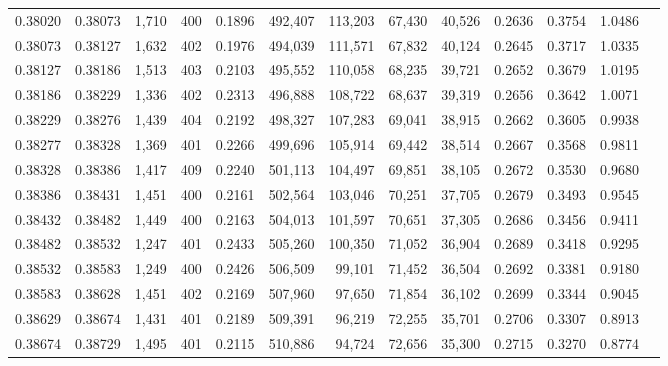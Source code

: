 \begin{tabular}{rrrrrrrrrrrrr}
0.38020 & 0.38073 &  1,710 & 400 &                                     0.1896 & 492,407 & 113,203 &  67,430 &  40,526 & 0.2636 & 0.3754 & 1.0486 \\
0.38073 & 0.38127 &  1,632 & 402 &                                     0.1976 & 494,039 & 111,571 &  67,832 &  40,124 & 0.2645 & 0.3717 & 1.0335 \\
0.38127 & 0.38186 &  1,513 & 403 &                                     0.2103 & 495,552 & 110,058 &  68,235 &  39,721 & 0.2652 & 0.3679 & 1.0195 \\
0.38186 & 0.38229 &  1,336 & 402 &                                     0.2313 & 496,888 & 108,722 &  68,637 &  39,319 & 0.2656 & 0.3642 & 1.0071 \\
0.38229 & 0.38276 &  1,439 & 404 &                                     0.2192 & 498,327 & 107,283 &  69,041 &  38,915 & 0.2662 & 0.3605 & 0.9938 \\
0.38277 & 0.38328 &  1,369 & 401 &                                     0.2266 & 499,696 & 105,914 &  69,442 &  38,514 & 0.2667 & 0.3568 & 0.9811 \\
0.38328 & 0.38386 &  1,417 & 409 &                                     0.2240 & 501,113 & 104,497 &  69,851 &  38,105 & 0.2672 & 0.3530 & 0.9680 \\
0.38386 & 0.38431 &  1,451 & 400 &                                     0.2161 & 502,564 & 103,046 &  70,251 &  37,705 & 0.2679 & 0.3493 & 0.9545 \\
0.38432 & 0.38482 &  1,449 & 400 &                                     0.2163 & 504,013 & 101,597 &  70,651 &  37,305 & 0.2686 & 0.3456 & 0.9411 \\
0.38482 & 0.38532 &  1,247 & 401 &                                     0.2433 & 505,260 & 100,350 &  71,052 &  36,904 & 0.2689 & 0.3418 & 0.9295 \\
0.38532 & 0.38583 &  1,249 & 400 &                                     0.2426 & 506,509 &  99,101 &  71,452 &  36,504 & 0.2692 & 0.3381 & 0.9180 \\
0.38583 & 0.38628 &  1,451 & 402 &                                     0.2169 & 507,960 &  97,650 &  71,854 &  36,102 & 0.2699 & 0.3344 & 0.9045 \\
0.38629 & 0.38674 &  1,431 & 401 &                                     0.2189 & 509,391 &  96,219 &  72,255 &  35,701 & 0.2706 & 0.3307 & 0.8913 \\
0.38674 & 0.38729 &  1,495 & 401 &                                     0.2115 & 510,886 &  94,724 &  72,656 &  35,300 & 0.2715 & 0.3270 & 0.8774 \\

\end{tabular}
